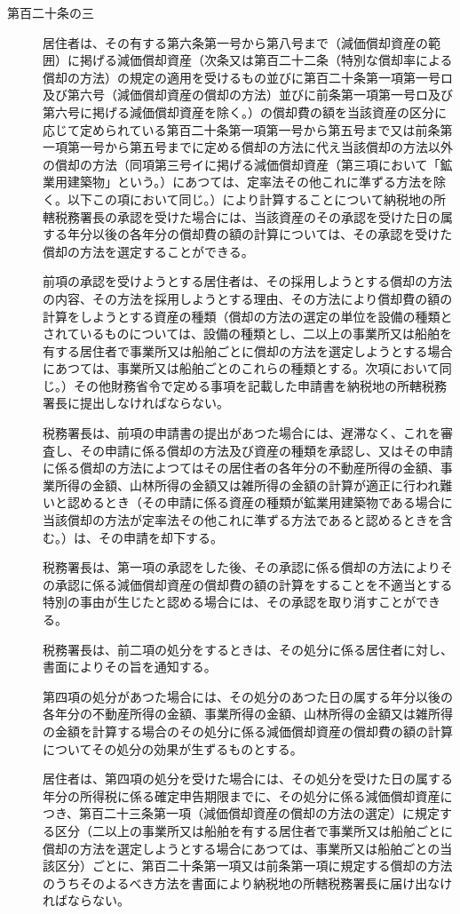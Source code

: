 \documentclass[twocolumn,a4j,10pt]{ltjtarticle}
\begin{document}
\begin{description}
\item[第百二十条の三]居住者は、その有する第六条第一号から第八号まで（減価償却資産の範囲）に掲げる減価償却資産（次条又は第百二十二条（特別な償却率による償却の方法）の規定の適用を受けるもの並びに第百二十条第一項第一号ロ及び第六号（減価償却資産の償却の方法）並びに前条第一項第一号ロ及び第六号に掲げる減価償却資産を除く。）の償却費の額を当該資産の区分に応じて定められている第百二十条第一項第一号から第五号まで又は前条第一項第一号から第五号までに定める償却の方法に代え当該償却の方法以外の償却の方法（同項第三号イに掲げる減価償却資産（第三項において「鉱業用建築物」という。）にあつては、定率法その他これに準ずる方法を除く。以下この項において同じ。）により計算することについて納税地の所轄税務署長の承認を受けた場合には、当該資産のその承認を受けた日の属する年分以後の各年分の償却費の額の計算については、その承認を受けた償却の方法を選定することができる。
\item[]前項の承認を受けようとする居住者は、その採用しようとする償却の方法の内容、その方法を採用しようとする理由、その方法により償却費の額の計算をしようとする資産の種類（償却の方法の選定の単位を設備の種類とされているものについては、設備の種類とし、二以上の事業所又は船舶を有する居住者で事業所又は船舶ごとに償却の方法を選定しようとする場合にあつては、事業所又は船舶ごとのこれらの種類とする。次項において同じ。）その他財務省令で定める事項を記載した申請書を納税地の所轄税務署長に提出しなければならない。
\item[]税務署長は、前項の申請書の提出があつた場合には、遅滞なく、これを審査し、その申請に係る償却の方法及び資産の種類を承認し、又はその申請に係る償却の方法によつてはその居住者の各年分の不動産所得の金額、事業所得の金額、山林所得の金額又は雑所得の金額の計算が適正に行われ難いと認めるとき（その申請に係る資産の種類が鉱業用建築物である場合に当該償却の方法が定率法その他これに準ずる方法であると認めるときを含む。）は、その申請を却下する。
\item[]税務署長は、第一項の承認をした後、その承認に係る償却の方法によりその承認に係る減価償却資産の償却費の額の計算をすることを不適当とする特別の事由が生じたと認める場合には、その承認を取り消すことができる。
\item[]税務署長は、前二項の処分をするときは、その処分に係る居住者に対し、書面によりその旨を通知する。
\item[]第四項の処分があつた場合には、その処分のあつた日の属する年分以後の各年分の不動産所得の金額、事業所得の金額、山林所得の金額又は雑所得の金額を計算する場合のその処分に係る減価償却資産の償却費の額の計算についてその処分の効果が生ずるものとする。
\item[]居住者は、第四項の処分を受けた場合には、その処分を受けた日の属する年分の所得税に係る確定申告期限までに、その処分に係る減価償却資産につき、第百二十三条第一項（減価償却資産の償却の方法の選定）に規定する区分（二以上の事業所又は船舶を有する居住者で事業所又は船舶ごとに償却の方法を選定しようとする場合にあつては、事業所又は船舶ごとの当該区分）ごとに、第百二十条第一項又は前条第一項に規定する償却の方法のうちそのよるべき方法を書面により納税地の所轄税務署長に届け出なければならない。
\end{description}
\end{document}
